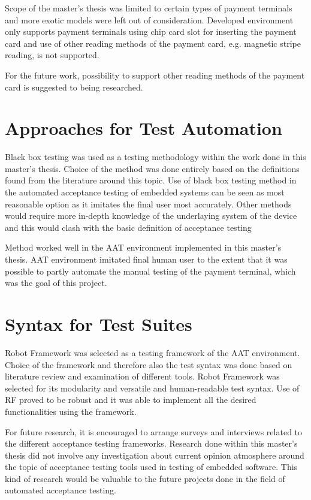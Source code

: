Scope of the master's thesis was limited to certain types of payment terminals and more exotic models were left out of consideration. Developed environment only supports payment terminals using chip card slot for inserting the payment card and use of other reading methods of the payment card, e.g. magnetic stripe reading, is not supported.

For the future work, possibility to support other reading methods of the payment card is suggested to being researched.

\section{Approaches for Test Automation}

Black box testing was used as a testing methodology within the work done in this master's thesis. Choice of the method was done entirely based on the definitions found from the literature around this topic. Use of black box testing method in the automated acceptance testing of embedded systems can be seen as most reasonable option as it imitates the final user most accurately. Other methods would require more in-depth knowledge of the underlaying system of the device and this would clash with the basic definition of acceptance testing

Method worked well in the AAT environment implemented in this master's thesis. AAT environment imitated final human user to the extent that it was possible to partly automate the manual testing of the payment terminal, which was the goal of this project.

\section{Syntax for Test Suites}

Robot Framework was selected as a testing framework of the AAT environment. Choice of the framework and therefore also the test syntax was done based on literature review and examination of different tools. Robot Framework was selected for its modularity and versatile and human-readable test syntax. Use of RF proved to be robust and it was able to implement all the desired functionalities using the framework.

For future research, it is encouraged to arrange surveys and interviews related to the different acceptance testing frameworks. Research done within this master's thesis did not involve any investigation about current opinion atmosphere around the topic of acceptance testing tools used in testing of embedded software. This kind of research would be valuable to the future projects done in the field of automated acceptance testing.



